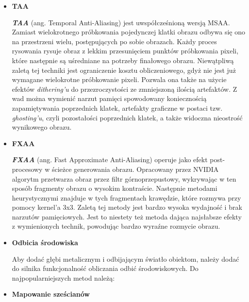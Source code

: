 \begin{itemize}
	\vfill
	\clearpage
	
	\item \textbf{TAA}
	
	\emph{\textbf{TAA}} (ang. Temporal Anti-Aliasing) jest uwspółcześnioną wersją MSAA. Zamiast wielokrotnego próbkowania pojedynczej klatki obrazu odbywa się ono na przestrzeni wielu, postępujących po sobie obrazach. Każdy proces rysowania rysuje obraz z lekkim przesunięciem punktów próbkowania pixeli, które następnie są uśredniane na potrzeby finałowego obrazu. Niewątpliwą zaletą tej techniki jest ograniczenie kosztu obliczeniowego, gdyż nie jest już wymagane wielokrotne próbkowanie pixeli. Pozwala ona także na użycie efektów \emph{dithering'u} do przezroczystości ze zmniejszoną ilością artefaktów. Z wad można wymienić narzut pamięci spowodowany koniecznością zapamiętywania poprzednich klatek, artefakty graficzne w postaci tzw. \emph{ghosting'u}, czyli pozostałości poprzednich klatek, a także widoczna nieostrość wynikowego obrazu.
	
	\item \textbf{FXAA}
	
	\emph{\textbf{FXAA}} (ang. Fast Approximate Anti-Aliasing) operuje jako efekt post-procesowy w ścieżce generowania obrazu. Opracowany przez NVIDIA algorytm przetwarza obraz przez filtr górnoprzepustowy, wykrywając w ten sposób fragmenty obrazu o wysokim kontraście. Następnie metodami heurystycznymi znajduje w tych fragmentach krawędzie, które rozmywa przy pomocy kernel'a 3x3. Zaletą tej metody jest bardzo wysoka wydajność i brak narzutów pamięciowych. Jest to niestety też metoda dająca najsłabsze efekty z wymienionych technik, powodując bardzo wyraźne rozmycie obrazu.
	
	\item \textbf{Odbicia środowiska}
	
	Aby dodać głębi metalicznym i odbijającym światło obiektom, należy dodać do silnika funkcjonalność obliczania odbić środowiskowych. Do najpopularniejszych metod należą:

	\item \textbf{Mapowanie sześcianów}


\end{itemize}
